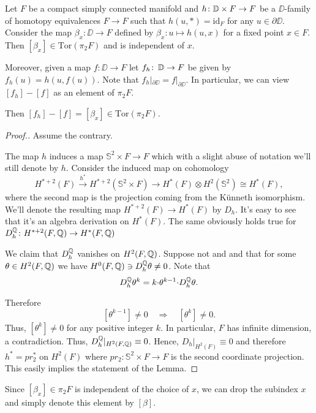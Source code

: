 \documentclass{amsart}
\begin{document}
\begin{techlem}\label{techlem}
Let $F$ be a compact simply connected manifold and
$h\colon \DD\z\times F\z\to F$ be  a
$\DD$-family of homotopy equivalences $F\to F$ such that $h(u,*)=\mathrm{id}_F$ for any
$u\in\partial \DD$. 
Consider the map $\beta_x\colon \DD\to F$ defined by $\beta_x\colon u\mapsto h(u,x)$ for a fixed point $x\in F$. 
Then $[\beta_x]\in \mathrm{Tor}(\pi_2F)$ and is independent of $x$.

Moreover, given a map $f\colon \DD\to F$ let $f_h\colon\thinspace \mathbb{D}\to F$ be given by $f_h(u)=h(u,f(u))$.
Note that  $f_h|_{\partial \DD}=f|_{\partial \DD}$. In particular, we can view $[f_h]-[f]$ as an element of $\pi_2F$.

Then 
$[f_h]-[f]=[\beta_x]\in \mathrm{Tor}(\pi_2F)$. 
\end{techlem}

\begin{proof}[Proof.] Assume the contrary. 

The map $h$ induces a map $\mathbb{S}^2\times F\to F$ which with a  slight abuse of notation we'll still denote by $h$. 
Consider the induced map on cohomology
\[H^{*+2}(F)\overset{h^*}{\longrightarrow} H^{*+2}(\mathbb{S}^2\times F)\to H^*(F)\otimes H^2(\mathbb{S}^2)\cong  H^*(F),\]
where the second map is the projection coming from the K\"unneth isomorphism.
We'll denote the resulting map $H^{*+2}(F)\to H^*(F)$ by $D_h$. It's easy to see that it's an algebra derivation on $H^*(F)$. The same obviously holds true for $D_h^{\mathbb{Q}}\colon H^{*+2}(F,\mathbb{Q})\to H^*(F,\mathbb{Q})$

 We claim that  $D_h^{\mathbb{Q}}$ vanishes on $H^2(F,\mathbb{Q})$. Suppose not and and that
  for some 
$\theta\in H^2(F,\mathbb{Q})$ we have $H^0(F,\mathbb{Q})\ni D_h^{\mathbb{Q}}\theta\not=0$. 
Note that \[D_h^{\mathbb{Q}}\theta^k=k{\cdot} \theta^{k-1}{\cdot} D_h^{\mathbb{Q}}\theta.\] 




Therefore 
\[[\theta^{k-1}]\ne0
\quad
\Longrightarrow
\quad[\theta^{k}]\ne0.\]
Thus,  $[\theta^{k}]\not=0$ for any positive integer $k$.
In particular, $F$ has infinite dimension, a contradiction. 
Thus, $D^{\mathbb{Q}}_h|_{H^2(F,\mathbb{Q})}\equiv 0$. Hence, $D_h|_{H^2(F)}\equiv 0$ and therefore $h^*=pr_2^*$ on $H^2(F)$ where $pr_2\colon \mathbb{S}^2\times F\to F$ is the second coordinate projection. 
This  easily implies the statement of the Lemma.
\end{proof}
\begin{rmk}
Since $[\beta_x] \in \pi_2F$ is independent of the choice of $x$, we can drop the subindex $x$ and simply denote this element by $[\beta]$.
\end{rmk} 
\end{document}
